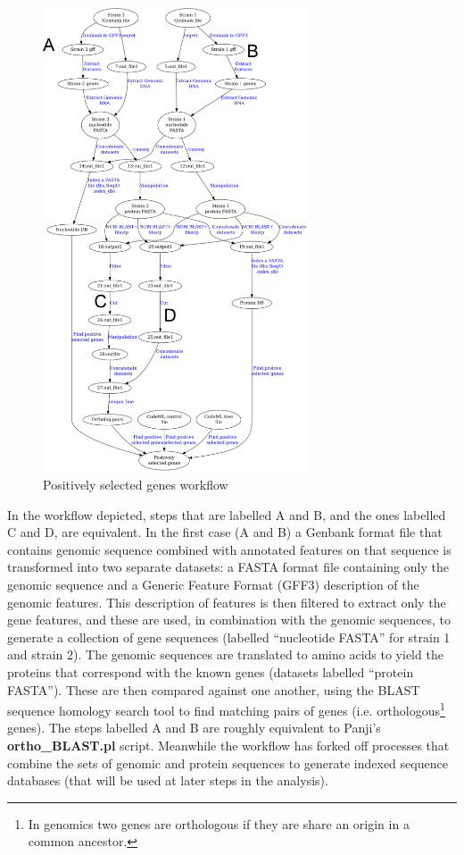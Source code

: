 \documentclass[a4paper,10pt]{scrreprt}
\begin{document}
\begin{figure}[!htb]
\centering
\includegraphics[width=0.7\textwidth]{images/positive_selection_workflow_graph.png}
\caption{Positively selected genes workflow}
\label{fig:positive_selection_workflow_graph}
\end{figure}

In the workflow depicted, steps that are labelled A and B, and the ones labelled C and D, are equivalent. In the first case (A and B) a Genbank format file that contains genomic sequence combined with annotated features on that sequence is transformed into two separate datasets: a FASTA format file containing only the genomic sequence and a Generic Feature Format (GFF3) description of the genomic features. This description of features is then filtered to extract only the gene features, and these are used, in combination with the genomic sequences, to generate a collection of gene sequences (labelled ``nucleotide FASTA'' for strain 1 and strain 2). The genomic sequences are translated to amino acids to yield the proteins that correspond with the known genes (datasets labelled ``protein FASTA''). These are then compared against one another, using the BLAST sequence homology search tool to find matching pairs of genes (i.e. orthologous\footnote{In genomics two genes are orthologous if they are share an origin 
in a common ancestor.} genes). The steps labelled A and B are roughly equivalent to Panji's \textbf{ortho\_BLAST.pl} script. Meanwhile the workflow has forked off processes that combine the sets of genomic and protein sequences to generate indexed sequence databases (that will be used at later steps in the analysis).
\end{document}
